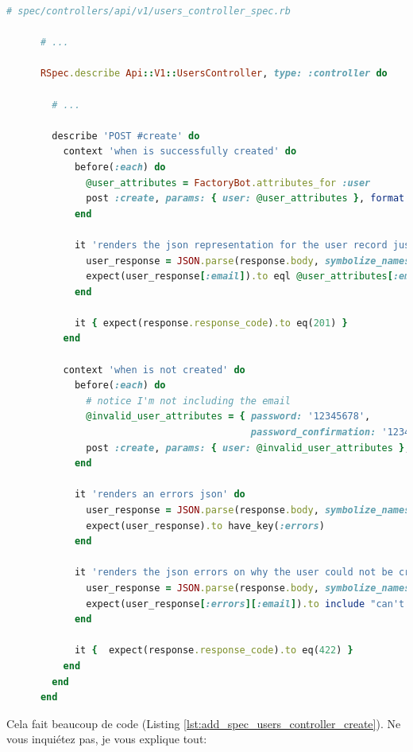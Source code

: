 \documentclass[]{report}
\begin{document}
      \begin{scriptsize}
      \begin{lstlisting}[language=ruby, caption={Ajout les tests de création des utilisateurs}, label={lst:add_spec_users_controller_create}]
      # spec/controllers/api/v1/users_controller_spec.rb

      # ...

      RSpec.describe Api::V1::UsersController, type: :controller do

        # ...

        describe 'POST #create' do
          context 'when is successfully created' do
            before(:each) do
              @user_attributes = FactoryBot.attributes_for :user
              post :create, params: { user: @user_attributes }, format: :json
            end

            it 'renders the json representation for the user record just created' do
              user_response = JSON.parse(response.body, symbolize_names: true)
              expect(user_response[:email]).to eql @user_attributes[:email]
            end

            it { expect(response.response_code).to eq(201) }
          end

          context 'when is not created' do
            before(:each) do
              # notice I'm not including the email
              @invalid_user_attributes = { password: '12345678',
                                           password_confirmation: '12345678' }
              post :create, params: { user: @invalid_user_attributes }, format: :json
            end

            it 'renders an errors json' do
              user_response = JSON.parse(response.body, symbolize_names: true)
              expect(user_response).to have_key(:errors)
            end

            it 'renders the json errors on why the user could not be created' do
              user_response = JSON.parse(response.body, symbolize_names: true)
              expect(user_response[:errors][:email]).to include "can't be blank"
            end

            it {  expect(response.response_code).to eq(422) }
          end
        end
      end
      \end{lstlisting}
      \end{scriptsize}

      Cela fait beaucoup de code (Listing \ref{lst:add_spec_users_controller_create}). Ne vous inquiétez pas, je vous explique tout:
\end{document}
